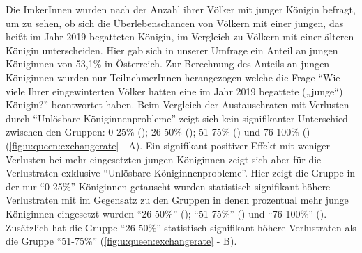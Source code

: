 \label{ss:junge_koeniginnen:U}

Die ImkerInnen wurden nach der Anzahl ihrer Völker mit junger Königin befragt, um zu sehen, ob sich die Überlebenschancen von Völkern mit einer jungen, das heißt im Jahr 2019 begatteten Königin, im Vergleich zu Völkern mit einer älteren Königin unterscheiden. Hier gab sich in unserer Umfrage ein Anteil an jungen Königinnen von 53,1\% in Österreich. Zur Berechnung des Anteils an jungen Königinnen wurden nur TeilnehmerInnen herangezogen welche die Frage \enquote{Wie viele Ihrer eingewinterten Völker hatten eine im Jahr 2019 begattete („junge``) Königin?} beantwortet haben.
\newline
Beim Vergleich der Austauschraten mit Verlusten durch \enquote{Unlösbare Königinnenprobleme} zeigt sich kein signifikanter Unterschied zwischen den Gruppen: 0-25\% (); 26-50\% (); 51-75\% () und 76-100\% () (\cref{fig:u:queen:exchangerate} - A).
\newline
Ein signifikant positiver Effekt mit weniger Verlusten bei mehr eingesetzten jungen Königinnen zeigt sich aber für die Verlustraten exklusive \enquote{Unlösbare Königinnenprobleme}. Hier zeigt die Gruppe in der nur \enquote{0-25\%} Königinnen getauscht wurden statistisch signifikant höhere Verlustraten mit  im Gegensatz zu den Gruppen in denen prozentual mehr junge Königinnen eingesetzt wurden \enquote{26-50\%} (); \enquote{51-75\%} () und \enquote{76-100\%} (). Zusätzlich hat die Gruppe \enquote{26-50\%} statistisch signifikant höhere Verlustraten als die Gruppe \enquote{51-75\%} (\cref{fig:u:queen:exchangerate} - B).

